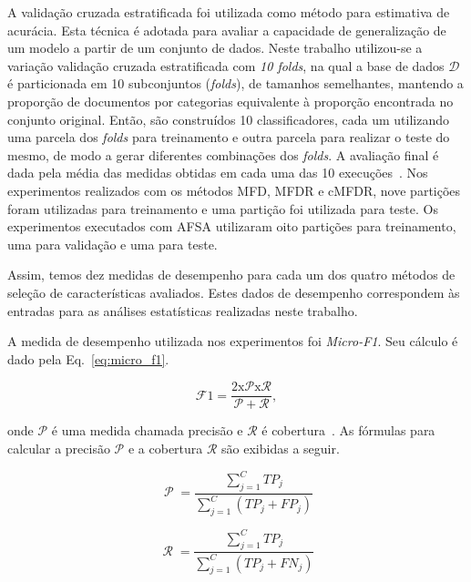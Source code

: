 \documentclass[conference]{IEEEtran}
\begin{document}
A validação cruzada estratificada foi utilizada como método para estimativa de acurácia.
Esta técnica é adotada para avaliar a capacidade de generalização de um modelo a partir de um conjunto de dados.
Neste trabalho utilizou-se a variação validação cruzada estratificada com \emph{10 folds}, na qual a base de dados $\mathcal{D}$ é particionada em 10 subconjuntos (\emph{folds}), de tamanhos semelhantes, mantendo a proporção de documentos por categorias equivalente à proporção encontrada no conjunto original. Então, são construídos 10 classificadores, cada um utilizando uma parcela dos \emph{folds} para treinamento e outra parcela para realizar o teste do mesmo, de modo a gerar diferentes combinações dos \emph{folds}.
A avaliação final é dada pela média das medidas obtidas em cada uma das 10 execuções~\cite{kohavi1995study}.
Nos experimentos realizados com os métodos MFD, MFDR e cMFDR, nove partições foram utilizadas para treinamento e uma partição foi utilizada para teste.
Os experimentos executados com AFSA utilizaram oito partições para treinamento, uma para validação e uma para teste.

Assim, temos dez medidas de desempenho para cada um dos quatro métodos de seleção de características avaliados.
Estes dados de desempenho correspondem às entradas para as análises estatísticas realizadas neste trabalho.

A medida de desempenho utilizada nos experimentos foi \textit{Micro-F1}.
Seu cálculo é dado pela Eq.~\ref{eq:micro_f1}.

\begin{equation}
\operatorname{\mathcal{F}{1} = \frac{2 x \mathcal{P} x \mathcal{R}}{\mathcal{P} + \mathcal{R}}},
\label{eq:micro_f1}
\end{equation}

\noindent onde $\mathcal{P}$ é uma medida chamada precisão e $\mathcal{R}$ é cobertura~\cite{chang2008multilabel}. As fórmulas para calcular a precisão $\mathcal{P}$ e a cobertura $\mathcal{R}$ são exibidas a seguir.

\begin{equation}
\operatorname{\mathcal{P}} = \frac{\sum_{j=1}^{C}TP_j}{\sum_{j=1}^{C}(TP_j + FP_j)}
\label{eq:precision}
\end{equation}

\begin{equation}
\operatorname{\mathcal{R}} = \frac{\sum_{j=1}^{C}TP_j}{\sum_{j=1}^{C}(TP_j + FN_j)}
\label{eq:recall}
\end{equation}
\end{document}
